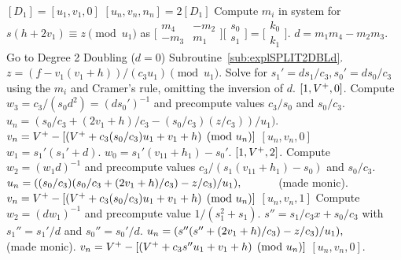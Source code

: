 \begin{algorithm}[htbp]
\caption{Genus 2 Split Model Degree 2 Doubling\label{alg:explSPLIT2DBL}}
\begin{algorithmic} [1]
\Require $[D_1]= [u_1, v_1,0]$ \smallskip
\Ensure $[u_n,v_n,n_n] = 2[D_1]$
\algrule
\State Compute $m_i$ in system for $s(h + 2v_1)\equiv z \pmod{u_1}$ as $ \bigl[
\begin{smallmatrix} m_4 & -m_2\\ -m_3 & m_1\end{smallmatrix}\bigr] \bigl[
\begin{smallmatrix} s_0\\ s_1 \end{smallmatrix} \bigr ] = \bigl[ \begin{smallmatrix}k_0
\\  k_1\end{smallmatrix} \bigr ]$.
\State $d = m_1m_4 - m_2m_3$.
 Go to Degree 2 Doubling ($d = 0$) Subroutine~\ref{sub:explSPLIT2DBLd}.
\EndIf
\State $z = (f - v_1(v_1 + h))/(c_3u_1) \pmod{u_1}.$
\State Solve for $s_1' = ds_1/c_3, s_0' = ds_0/c_3$ using the $m_i$ and Cramer's rule, omitting the inversion of $d$.
     \Return $[1,V^{+},0]$.
    \Else \hspace{4pt}
        \State Compute $w_3 = c_3/(s_0d^2) = (ds_0')^{-1}$ and precompute values $c_3/s_0$ and  $s_0/c_3$.
        \State $u_n = (s_0/c_3 + (2v_1+ h)/c_3 - (s_0/c_3)(z/c_3))/u_1)$.
        \State $v_n = V^{+} - [(V^{+} + c_3(s_0/c_3)u_1 + v_1 + h) \pmod{u_n}]$
        \State \Return $[u_n,v_n,0]$
    \EndIf
\EndIf
\State $w_1 = s_1'(s_1' + d)$.
    \State $w_0 = s_1'(v_{11} + h_1) - s_0'$.
     \Return $[1,V^{+},2]$.
    \Else \hspace{4pt}
        \State Compute $w_2 = (w_1d)^{-1}$ and precompute values $c_3/(s_1(v_{11} + h_1) - s_0)$ and $s_0/c_3$.
        \State $u_n = ((s_0/c_3)(s_0/c_3 + (2v_1+ h)/c_3) - z/c_3)/u_1), \quad\quad\quad $ (made monic).
        \State $v_n = V^{+} - [(V^{+} + c_3(s_0/c_3)u_1 + v_1 + h) \pmod{u_n}]$
        \State \Return $[u_n,v_n,1]$
    \EndIf
\EndIf
\State Compute $w_2 = (dw_1)^{-1}$ and precompute value $1/(s_1^2 + s_1)$.
\State $s'' = s_1/c_3x + s_0/c_3$ with $s_1'' = s_1'/d$ and $s_0'' = s_0'/d$.
\State $u_n = (s''(s'' + (2v_1+ h)/c_3) - z/c_3)/u_1), \quad\quad\quad $ (made monic).
\State $v_n = V^{+} - [(V^{+} + c_3s''u_1 + v_1 + h) \pmod{u_n}]$
\State \Return $[u_n,v_n,0]$.
\end{algorithmic}
\end{algorithm}
    

